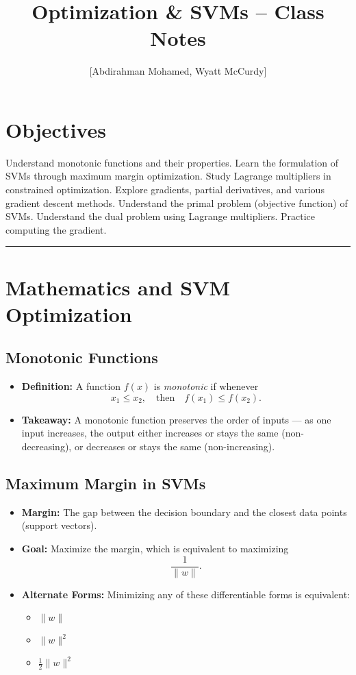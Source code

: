 \documentclass[11pt]{article}
\title{Optimization \& SVMs -- Class Notes}
\author{[Abdirahman Mohamed, Wyatt McCurdy]}
\date{}
\begin{document}
\maketitle

\section*{Objectives}
\begin{outline}
    \1 Understand monotonic functions and their properties.
    \1 Learn the formulation of SVMs through maximum margin optimization.
    \1 Study Lagrange multipliers in constrained optimization.
    \1 Explore gradients, partial derivatives, and various gradient descent methods.
    \1 Understand the primal problem (objective function) of SVMs.
    \1 Understand the dual problem using Lagrange multipliers.
    \1 Practice computing the gradient.
\end{outline}

\rule[0.0051in]{\textwidth}{0.00025in}

\section{Mathematics and SVM Optimization}

\subsection{Monotonic Functions}
\begin{itemize}
    \item \textbf{Definition:} A function \( f(x) \) is \emph{monotonic} if whenever 
    \[
    x_1 \leq x_2, \quad \text{then} \quad f(x_1) \leq f(x_2).
    \]
    \item \textbf{Takeaway:} A monotonic function preserves the order of inputs — as one input increases, the output either increases or stays the same (non-decreasing), or decreases or stays the same (non-increasing).
\end{itemize}

\subsection{Maximum Margin in SVMs}
\begin{itemize}
    \item \textbf{Margin:} The gap between the decision boundary and the closest data points (support vectors).
    \item \textbf{Goal:} Maximize the margin, which is equivalent to maximizing 
    \[
    \frac{1}{\|w\|}.
    \]
    \item \textbf{Alternate Forms:} Minimizing any of these differentiable forms is equivalent:
    \begin{itemize}
        \item \(\|w\|\)
        \item \(\|w\|^2\)
        \item \(\frac{1}{2}\|w\|^2\)
    \end{itemize}
\end{itemize}
\end{document}
